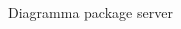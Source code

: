 \begin{adjustwidth}{-3cm}{-3cm}
	\begin{figure}[H]
		\caption{Diagramma package server}
	\end{figure}
\end{adjustwidth}
